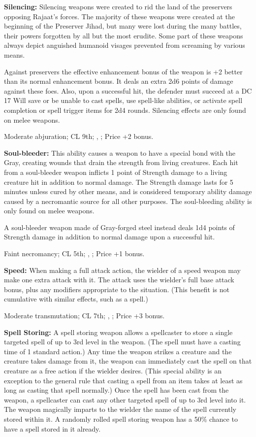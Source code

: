 \textbf{Silencing:} Silencing weapons were created to rid the land of the preservers opposing Rajaat's forces. The majority of these weapons were created at the beginning of the Preserver Jihad, but many were lost during the many battles, their powers forgotten by all but the most erudite. Some part of these weapons always depict anguished humanoid visages prevented from screaming by various means.

Against preservers the effective enhancement bonus of the weapon is +2 better than its normal enhancement bonus. It deals an extra 2d6 points of damage against these foes. Also, upon a successful hit, the defender must succeed at a DC 17 Will save or be unable to cast spells, use spell-like abilities, or activate spell completion or spell trigger items for 2d4 rounds. Silencing effects are only found on melee weapons.

Moderate abjuration; CL 9th; , ; Price +2 bonus.


\textbf{Soul-bleeder:} This ability causes a weapon to have a special bond with the Gray, creating wounds that drain the strength from living creatures. Each hit from a soul-bleeder weapon inflicts 1 point of Strength damage to a living creature hit in addition to normal damage. The Strength damage lasts for 5 minutes unless cured by other means, and is considered temporary ability damage caused by a necromantic source for all other purposes. The soul-bleeding ability is only found on melee weapons.

A soul-bleeder weapon made of Gray-forged steel instead deals 1d4 points of Strength damage in addition to normal damage upon a successful hit.

Faint necromancy; CL 5th; , ; Price +1 bonus.


\textbf{Speed:} When making a full attack action, the wielder of a speed weapon may make one extra attack with it. The attack uses the wielder's full base attack bonus, plus any modifiers appropriate to the situation. (This benefit is not cumulative with similar effects, such as a  spell.)

Moderate transmutation; CL 7th; , ; Price +3 bonus.


\textbf{Spell Storing:} A spell storing weapon allows a spellcaster to store a single targeted spell of up to 3rd level in the weapon. (The spell must have a casting time of 1 standard action.) Any time the weapon strikes a creature and the creature takes damage from it, the weapon can immediately cast the spell on that creature as a free action if the wielder desires. (This special ability is an exception to the general rule that casting a spell from an item takes at least as long as casting that spell normally.) Once the spell has been cast from the weapon, a spellcaster can cast any other targeted spell of up to 3rd level into it. The weapon magically imparts to the wielder the name of the spell currently stored within it. A randomly rolled spell storing weapon has a 50\% chance to have a spell stored in it already.


